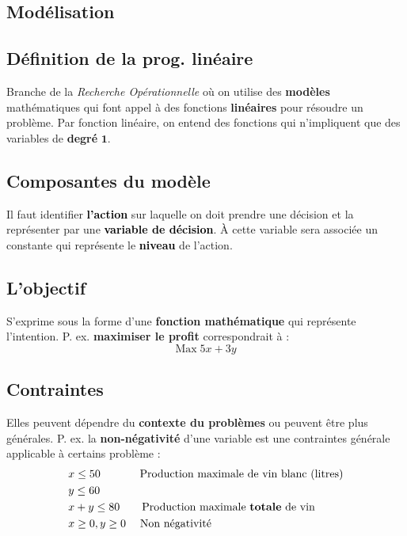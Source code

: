 \documentclass{report}
\begin{document}
\begin{multicols*}{2}
    \chapter{Modélisation}
    \footnotesize
\section{Définition de la prog. linéaire}

    Branche de la \textit{Recherche Opérationnelle} où on utilise 
    des \textbf{modèles} mathématiques qui font appel à 
    des fonctions \textcolor{myb}{\textbf{linéaires}} pour 
    résoudre un problème. Par fonction linéaire, on entend 
    des fonctions qui n'impliquent que des variables de 
    \textbf{degré} \( \boldsymbol 1 \).

\section{Composantes du modèle}
    Il faut identifier \textbf{\textcolor{black}{l'action}} sur 
    laquelle on doit prendre une décision et la représenter 
    par une \textbf{\textcolor{black}{variable de décision}}. À cette 
    variable sera associée un constante qui représente 
    le \textbf{\textcolor{black}{niveau}} de l'action.

\section{L'objectif} 
    S'exprime sous la forme d'une \textbf{fonction mathématique} 
    qui représente l'intention. P. ex. \textbf{maximiser le profit}
    correspondrait à : 
    \[%
        \text{Max} \; 5x + 3y 
    \]%

\section{Contraintes}
    Elles peuvent dépendre du \textbf{contexte du problèmes} 
    ou peuvent être plus générales. P. ex. la 
    \textbf{non-négativité} d'une variable est une contraintes générale
    applicable à certains problème : 
    \begin{align*}
    &x \leq 50  \quad\quad\quad\;\; \text{Production maximale de vin blanc } (\text{litres}) \\ 
    &y \leq 60 \\
    &x +  y \leq 80  \quad\quad \text{Production maximale \textbf{totale} de vin   }\\ 
    &x \geq 0, y \geq 0 \quad\; \text{Non négativité}
    \end{align*}


\end{multicols*}
\end{document}
